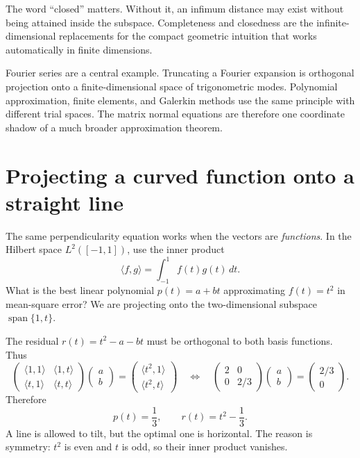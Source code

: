 The word ``closed'' matters.  Without it, an infimum distance may exist without being attained inside the subspace.  Completeness and closedness are the infinite-dimensional replacements for the compact geometric intuition that works automatically in finite dimensions.

Fourier series are a central example.  Truncating a Fourier expansion is orthogonal projection onto a finite-dimensional space of trigonometric modes.  Polynomial approximation, finite elements, and Galerkin methods use the same principle with different trial spaces.  The matrix normal equations are therefore one coordinate shadow of a much broader approximation theorem.

\section{Projecting a curved function onto a straight line}

The same perpendicularity equation works when the vectors are \emph{functions}. In the Hilbert space $L^2([-1,1])$, use the inner product
\[
 \langle f,g\rangle=\int_{-1}^1f(t)g(t)\,dt.
\]
What is the best linear polynomial $p(t)=a+bt$ approximating $f(t)=t^2$ in mean-square error? We are projecting onto the two-dimensional subspace $\operatorname{span}\{1,t\}$.

The residual $r(t)=t^2-a-bt$ must be orthogonal to both basis functions. Thus
\[
 \begin{pmatrix}
  \langle1,1\rangle &\langle1,t\rangle\\
  \langle t,1\rangle&\langle t,t\rangle
 \end{pmatrix}
 \begin{pmatrix}a\\b\end{pmatrix}
 =
 \begin{pmatrix}\langle t^2,1\rangle\\
                 \langle t^2,t\rangle\end{pmatrix}
 \quad\Longleftrightarrow\quad
 \begin{pmatrix}2&0\\0&2/3\end{pmatrix}
 \begin{pmatrix}a\\b\end{pmatrix}
 =\begin{pmatrix}2/3\\0\end{pmatrix}.
\]
Therefore
\[
 \boxed{p(t)=\frac13,\qquad r(t)=t^2-\frac13.}
\]
A line is allowed to tilt, but the optimal one is horizontal. The reason is symmetry: $t^2$ is even and $t$ is odd, so their inner product vanishes.

